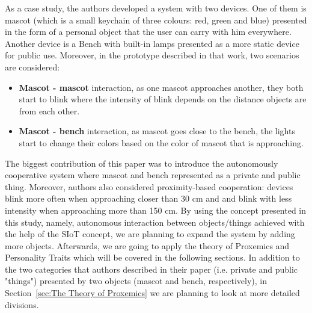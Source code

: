 As a case study, the authors developed a system with two devices.
One of them is mascot (which is a small keychain of three colours:
red, green and blue) presented in the form of a personal object that the user can carry with him everywhere.
Another device is a Bench with built-in lamps presented as a more static device for public use.
Moreover, in the prototype described in that work, two scenarios are considered:
\begin{itemize}
  \item \textbf{Mascot - mascot} interaction, as one mascot approaches another, they both start to blink where the
        intensity of blink depends on the distance objects are from each other.
  \item \textbf{Mascot - bench} interaction, as mascot goes close to the bench, the lights
        start to change their colors based on the color of mascot that is approaching.
\end{itemize}
The biggest contribution of this paper was to introduce the autonomously cooperative
system where mascot and bench represented as a private and public thing.
Moreover, authors also considered proximity-based cooperation: devices blink more often when
approaching closer than 30 cm and and blink with less intensity when approaching more than 150 cm.
By using the concept presented in this study, namely, autonomous interaction between objects/things
achieved with the help of the SIoT concept, we are planning to expand the system by adding more objects.
Afterwards, we are going to apply the theory of Proxemics and Personality
Traits which will be covered in the following sections.
In addition to the two categories that authors described in their paper (i.e. private and public "things")
presented by two objects (mascot and bench, respectively), in Section~\ref{sec:The Theory of Proxemics}
we are planning to look at more detailed divisions.

